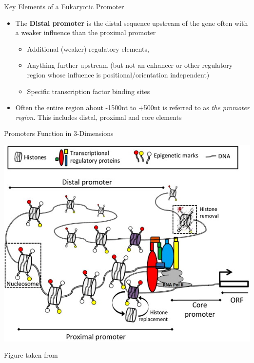 \documentclass[aspectratio=169,11pt]{beamer}
\begin{document}
\begin{frame}{Key Elements of a Eukaryotic Promoter}

	\begin{itemize}
		\item The \textbf{Distal promoter} is the distal sequence upstream of the gene often with a weaker influence than the proximal promoter
		\begin{itemize}
			\item Additional (weaker) regulatory elements, 
			\item Anything further upstream (but not an enhancer or other regulatory region whose influence is positional/orientation independent)
			\item Specific transcription factor binding sites
		\end{itemize}
		
		\item Often the entire region about -1500nt to +500nt is referred to as \textit{the promoter region}.
		This includes distal, proximal and core elements
		
	\end{itemize}

\end{frame}

\begin{frame}{Promoters Function in 3-Dimensions}

	\begin{center}
	\includegraphics[scale=0.5]{figures/promoterElementInteractions.jpg} 
	\end{center}

	\footnotesize 
	Figure taken from

\end{frame}
\end{document}

